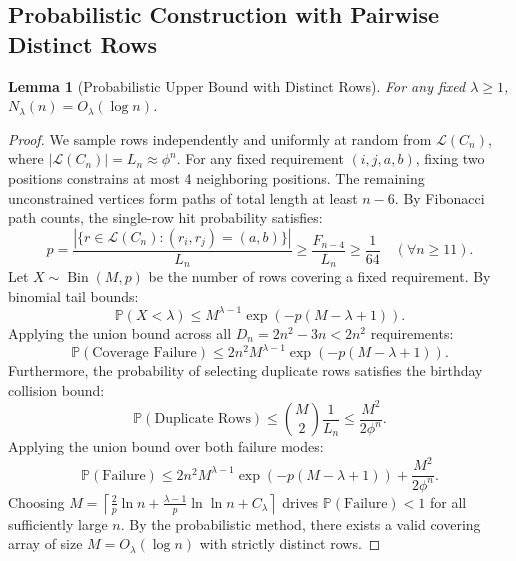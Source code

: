 \documentclass[11pt,a4paper]{article}
\newtheorem{lemma}[theorem]{Lemma}
\theoremstyle{definition}
\theoremstyle{remark}
\begin{document}
\subsection{Probabilistic Construction with Pairwise Distinct Rows}

\begin{lemma}[Probabilistic Upper Bound with Distinct Rows]
\label{lem:probabilistic_upper}
For any fixed $\lambda \ge 1$, $N_\lambda(n) = O_\lambda(\log n)$.
\end{lemma}

\begin{proof}
We sample rows independently and uniformly at random from $\mathcal{L}(C_n)$, where $|\mathcal{L}(C_n)| = L_n \approx \phi^n$.
For any fixed requirement $(i, j, a, b)$, fixing two positions constrains at most 4 neighboring positions. The remaining unconstrained vertices form paths of total length at least $n - 6$.
By Fibonacci path counts, the single-row hit probability satisfies:
\begin{equation}
    p = \frac{|\{r \in \mathcal{L}(C_n) : (r_i, r_j) = (a, b)\}|}{L_n} \ge \frac{F_{n-4}}{L_n} \ge \frac{1}{64} \quad (\forall n \ge 11).
\end{equation}
Let $X \sim \operatorname{Bin}(M, p)$ be the number of rows covering a fixed requirement. By binomial tail bounds:
\begin{equation}
    \mathbb{P}(X < \lambda) \le M^{\lambda - 1} \exp(-p(M - \lambda + 1)).
\end{equation}
Applying the union bound across all $D_n = 2n^2 - 3n < 2n^2$ requirements:
\begin{equation}
    \mathbb{P}(\text{Coverage Failure}) \le 2n^2 M^{\lambda - 1} \exp(-p(M - \lambda + 1)).
\end{equation}
Furthermore, the probability of selecting duplicate rows satisfies the birthday collision bound:
\begin{equation}
    \mathbb{P}(\text{Duplicate Rows}) \le \binom{M}{2} \frac{1}{L_n} \le \frac{M^2}{2 \phi^n}.
\end{equation}
Applying the union bound over both failure modes:
\begin{equation}
    \mathbb{P}(\text{Failure}) \le 2n^2 M^{\lambda - 1} \exp(-p(M - \lambda + 1)) + \frac{M^2}{2 \phi^n}.
\end{equation}
Choosing $M = \left\lceil \frac{2}{p} \ln n + \frac{\lambda - 1}{p} \ln \ln n + C_\lambda \right\rceil$ drives $\mathbb{P}(\text{Failure}) < 1$ for all sufficiently large $n$.
By the probabilistic method, there exists a valid covering array of size $M = O_\lambda(\log n)$ with strictly distinct rows.
\end{proof}
\end{document}

